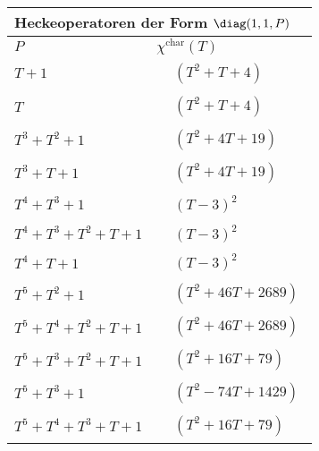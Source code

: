 \begin{tabular}{| l | l |}
\multicolumn{2}{l}{\bf Heckeoperatoren der Form $\diag(1,1,P)$} \\
\hline
$P$ & $\chi^\text{char}(T)$ \\
\hline
$T + 1$ &
$\!\begin{aligned}
	&(T^{2} + T + 4)\end{aligned}$ \\
\hline
$T$ &
$\!\begin{aligned}
	&(T^{2} + T + 4)\end{aligned}$ \\
\hline
$T^3 + T^2 + 1$ &
$\!\begin{aligned}
	&(T^{2} + 4T + 19)\end{aligned}$ \\
\hline
$T^3 + T + 1$ &
$\!\begin{aligned}
	&(T^{2} + 4T + 19)\end{aligned}$ \\
\hline
$T^4 + T^3 + 1$ &
$\!\begin{aligned}
	&(T - 3)^{2}\end{aligned}$ \\
\hline
$T^4 + T^3 + T^2 + T + 1$ &
$\!\begin{aligned}
	&(T - 3)^{2}\end{aligned}$ \\
\hline
$T^4 + T + 1$ &
$\!\begin{aligned}
	&(T - 3)^{2}\end{aligned}$ \\
\hline
$T^5 + T^2 + 1$ &
$\!\begin{aligned}
	&(T^{2} + 46T + 2689)\end{aligned}$ \\
\hline
$T^5 + T^4 + T^2 + T + 1$ &
$\!\begin{aligned}
	&(T^{2} + 46T + 2689)\end{aligned}$ \\
\hline
$T^5 + T^3 + T^2 + T + 1$ &
$\!\begin{aligned}
	&(T^{2} + 16T + 79)\end{aligned}$ \\
\hline
$T^5 + T^3 + 1$ &
$\!\begin{aligned}
	&(T^{2} - 74T + 1429)\end{aligned}$ \\
\hline
$T^5 + T^4 + T^3 + T + 1$ &
$\!\begin{aligned}
	&(T^{2} + 16T + 79)\end{aligned}$ \\

\end{tabular}
